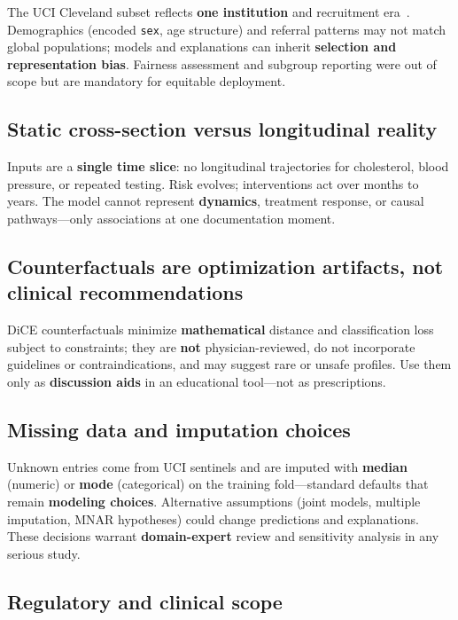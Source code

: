 \documentclass[11pt,a4paper]{article}
\begin{document}
The UCI Cleveland subset reflects \textbf{one institution} and recruitment era~\cite{detrano}. Demographics (encoded \texttt{sex}, age structure) and referral patterns may not match global populations; models and explanations can inherit \textbf{selection and representation bias}. Fairness assessment and subgroup reporting were out of scope but are mandatory for equitable deployment.

\subsection{Static cross-section versus longitudinal reality}

Inputs are a \textbf{single time slice}: no longitudinal trajectories for cholesterol, blood pressure, or repeated testing. Risk evolves; interventions act over months to years. The model cannot represent \textbf{dynamics}, treatment response, or causal pathways—only associations at one documentation moment.

\subsection{Counterfactuals are optimization artifacts, not clinical recommendations}

DiCE counterfactuals minimize \textbf{mathematical} distance and classification loss subject to constraints; they are \textbf{not} physician-reviewed, do not incorporate guidelines or contraindications, and may suggest rare or unsafe profiles. Use them only as \textbf{discussion aids} in an educational tool—not as prescriptions.

\subsection{Missing data and imputation choices}

Unknown entries come from UCI sentinels and are imputed with \textbf{median} (numeric) or \textbf{mode} (categorical) on the training fold—standard defaults that remain \textbf{modeling choices}. Alternative assumptions (joint models, multiple imputation, MNAR hypotheses) could change predictions and explanations. These decisions warrant \textbf{domain-expert} review and sensitivity analysis in any serious study.

\subsection{Regulatory and clinical scope}
\end{document}
